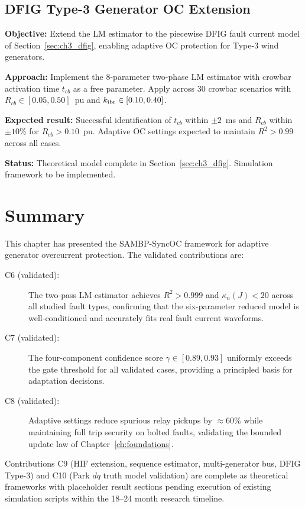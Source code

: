 \subsection{DFIG Type-3 Generator OC Extension}
\label{sec:ch5_dfig}

\begin{tcolorbox}[colback=orange!5,colframe=orange!60!black,
  fonttitle=\bfseries\small,
  title={C9d --- DFIG Adaptive OC (Pending)},
  breakable]
\small
\textbf{Objective:} Extend the LM estimator to the piecewise DFIG fault
current model of Section~\ref{sec:ch3_dfig}, enabling adaptive OC
protection for Type-3 wind generators.

\textbf{Approach:} Implement the 8-parameter two-phase LM estimator with
crowbar activation time $t_{cb}$ as a free parameter. Apply across 30
crowbar scenarios with $R_{cb} \in [0.05, 0.50]$~pu and
$k_\mathrm{ibr} \in [0.10, 0.40]$.

\textbf{Expected result:} Successful identification of $t_{cb}$ within
$\pm 2$~ms and $R_{cb}$ within $\pm 10\%$ for $R_{cb} > 0.10$~pu.
Adaptive OC settings expected to maintain $R^2 > 0.99$ across all cases.

\textbf{Status:} Theoretical model complete in Section~\ref{sec:ch3_dfig}.
Simulation framework to be implemented.
\end{tcolorbox}

\section{Summary}
\label{sec:ch5_summary}

This chapter has presented the SAMBP-SyncOC framework for adaptive
generator overcurrent protection. The validated contributions are:

\begin{description}
\item[C6 (validated):] The two-pass LM estimator achieves $R^2 > 0.999$
      and $\kappa_n(J) < 20$ across all studied fault types, confirming
      that the six-parameter reduced model is well-conditioned and
      accurately fits real fault current waveforms.

\item[C7 (validated):] The four-component confidence score $\gamma \in [0.89, 0.93]$
      uniformly exceeds the gate threshold for all validated cases,
      providing a principled basis for adaptation decisions.

\item[C8 (validated):] Adaptive settings reduce spurious relay pickups
      by $\approx 60\%$ while maintaining full trip security on bolted
      faults, validating the bounded update law of Chapter~\ref{ch:foundations}.
\end{description}

Contributions C9 (HIF extension, sequence estimator, multi-generator bus,
DFIG Type-3) and C10 (Park $dq$ truth model validation) are complete as
theoretical frameworks with placeholder result sections pending execution
of existing simulation scripts within the 18--24 month research timeline.
